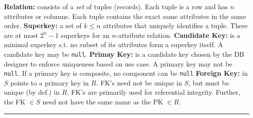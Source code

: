 \documentclass{report}
\renewcommand{\bf}[1]{\textbf{{#1}}}
\renewcommand{\tt}[1]{\texttt{{#1}}}
\renewcommand{\it}[1]{\textit{{#1}}}
\begin{document}
\bf{Relation:} consists of a \it{set} of tuples (records). Each tuple is a row and has $n$
attributes or columns. Each tuple contains the exact same attributes in the same order.
\hfil \newline
\bf{Superkey:} a set of $k \leq n$ attributes that uniquely identifies a tuple. There are at most
$2^n - 1$ superkeys for an $n$-attribute relation.
\hfil \newline
\bf{Candidate Key:} is a minimal superkey s.t. no subset of its attributes form a superkey itself.
A candidate key may be \tt{null}.
\hfil \newline
\bf{Primay Key:} is a candidate key chosen by the DB designer to enforce uniqueness based on use
case. A primary key may not be \tt{null}. If a primary key is composite, no component can be 
\tt{null}
\hfil \newline
\bf{Foreign Key:} in $S$ points to a primary key in $R$. FK's need not be unique in $S$, but must
be unique (by def.) in $R$. FK's are primarily used for referential integrity. Further, the FK
$\in S$ need not have the same name as the PK $\in R$.
\hfil \newline
\vspace{-0.8em}
\hrule
\vspace{0.2em}
\end{document}

